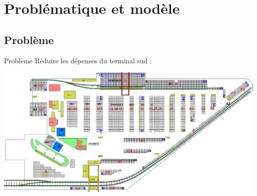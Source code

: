 
% 



\section{Problématique et modèle} 
\subsection{Problème}

\begin{frame}{Problème}
Réduire les dépenses du terminal sud :
\begin{center}
    \includegraphics[scale=0.5]{../images/Plan_Terminal.png}
\end{center}

\end{frame}
 


